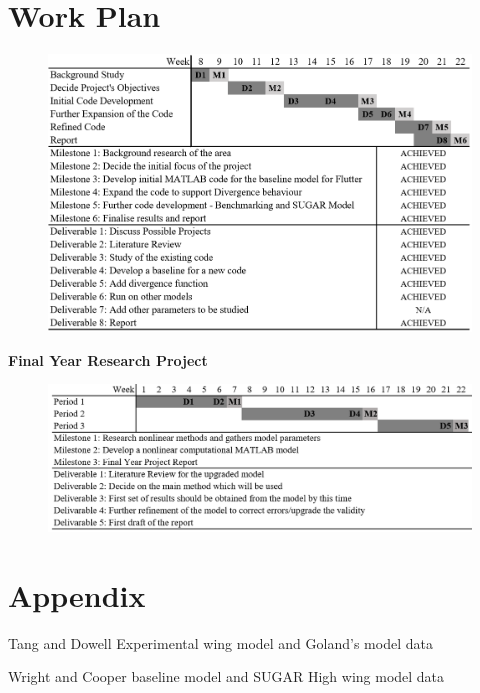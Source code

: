 \documentclass[11pt]{article}
\begin{document}
\section{Work Plan}
\begin{figure}[H]
    \centering
    \includegraphics[width = .9\textwidth]{figures/dandm.png}
\end{figure}

\textbf{Final Year Research Project}
\begin{figure}[H]
    \centering
    \includegraphics[width = .9\textwidth]{figures/fyp.png}
\end{figure}

\cleardoublepage

\newpage

\cleardoublepage

\section*{Appendix}

\begin{table}[H]
    \centering
    \caption{Tang and Dowell Experimental wing model\cite{Tang2001ExperimentalWings} and Goland's model \cite{CHETANNICHKAWDE2006NONLINEARCONTINUATION} data}
    
    \label{tab:TandD-exp-wing-data}
\end{table}
\begin{table}[H]
    \centering
    \caption{Wright and Cooper \cite{Wright2015INTRODUCTIONLOADS} baseline model and SUGAR High wing model \cite{Bradley2015SubsonicExploration} data}
    
    \label{tab:Goland-wing-data}
\end{table}
\end{document}
